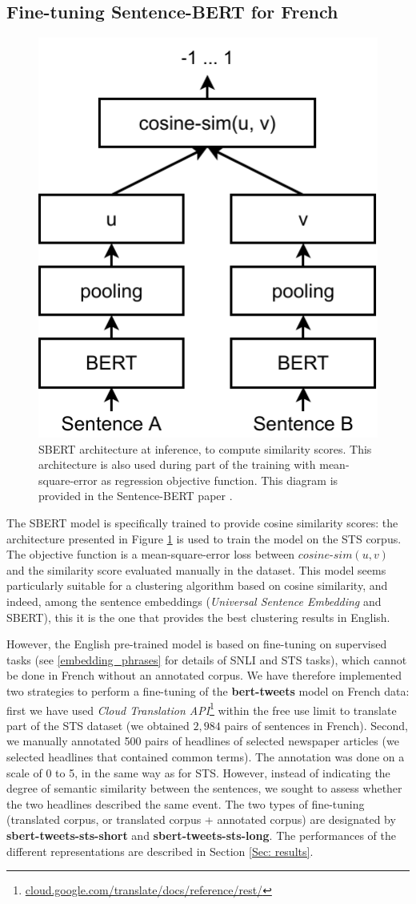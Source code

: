 \subsection{Fine-tuning Sentence-BERT for French}
\label{Subsec: Fine-tuning}
\begin{figure}[h]
  \centering
  \includegraphics[width=.3\linewidth]{figures/SentenceBERT.pdf}
  \caption{SBERT architecture at inference, to compute similarity scores. This architecture is also used during part of the training with mean-square-error as regression objective function. This diagram is provided in the Sentence-BERT paper \cite{reimers_2019_sentence}.}
  \label{Fig:SBERT}
\end{figure}
The SBERT model is specifically trained to provide cosine similarity scores: the architecture presented in Figure \ref{Fig:SBERT} is used to train the model
on the STS corpus. The objective function is a mean-square-error loss between $cosine\text{-}sim(u,v)$ and the similarity score evaluated manually in the dataset. This model seems particularly suitable for a clustering algorithm based on cosine similarity, and indeed, among the sentence embeddings (\textit{Universal Sentence Embedding} and SBERT), this it is the one that provides the best clustering results in English.

However, the English pre-trained model is based on fine-tuning on supervised tasks (see \ref{embedding_phrases} for details of SNLI and STS tasks), which cannot be done in French without an annotated corpus. We have therefore implemented two strategies to perform a fine-tuning of the \textbf{bert-tweets} model on French data: first we have used \textit{Cloud Translation API}\footnote{\url{cloud.google.com/translate/docs/reference/rest/}} within the free use limit to translate part of the STS dataset (we obtained $2,984$ pairs of sentences in French). Second, we manually annotated 500 pairs of headlines of selected newspaper articles (we selected headlines that contained common terms). The annotation was done on a scale of 0 to 5, in the same way as for STS. However, instead of indicating the degree of semantic similarity between the sentences, we sought to assess whether the two headlines described the same event. The two types of fine-tuning (translated corpus, or translated corpus + annotated corpus) are designated by \textbf{sbert-tweets-sts-short} and \textbf{sbert-tweets-sts-long}. The performances of the different representations are described in Section \ref{Sec: results}.

